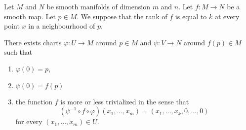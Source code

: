 \begin{theorem}       \label{THOooSWKVooTJQsXc}
	Let \( M\) and \( N\) be smooth manifolds of dimension \( m\) and \( n\). Let \( f\colon M\to N\) be a smooth map. Let \( p\in M\). We suppose that the rank of \( f\) is equal to \( k\) at every point \( x\) in a neighbourhood of \( p\).

	There exists charts \( \varphi\colon U\to M\) around \( p\in M\) and \( \psi\colon V\to N\) around \( f(p)\in M\) such that
	\begin{enumerate}
		\item
		      \( \varphi(0)=p\),
		\item
		      \( \psi(0)=f(p)\)
		\item
		      the function \( f\) is more or less trivialized in the sense that
		      \begin{equation}
			      (\psi^{-1}\circ f\circ\varphi)(x_1,\ldots, x_m)=(x_1,\ldots, x_k,0,\ldots, 0)
		      \end{equation}
		      for every \( (x_1,\ldots, x_m)\in U\).
	\end{enumerate}
\end{theorem}

